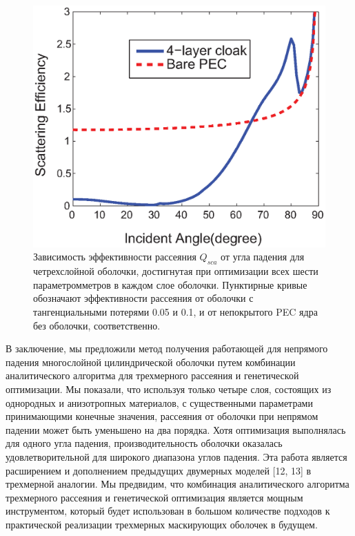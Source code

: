 \documentclass[a4paper, 12pt]{article}
\begin{document}
\begin{figure}
\centering
\includegraphics[width=0.5\columnwidth,draft=false]{Fig_3}
\caption{\label{fig:sca} Зависимость эффективности рассеяния $Q_{sca}$ 
от угла падения для четрехслойной оболочки, достигнутая при оптимизации
всех шести параметромметров в каждом слое оболочки. Пунктирные кривые обозначают
эффективности рассеяния от оболочки с тангенциальными потерями 0.05 и 0.1, и
от непокрытого PEC ядра без оболочки, соответственно.}
\end{figure}

В заключение, мы предложили метод получения работающей для непрямого падения
многослойной цилиндрической оболочки путем комбинации аналитического алгоритма 
для трехмерного рассеяния и генетической оптимизации. Мы показали, что
используя только четыре слоя, состоящих из однородных и анизотропных
материалов, с существенными параметрами принимающими конечные значения,
рассеяния от оболочки при непрямом падении может быть уменьшено на два порядка.
Хотя оптимизация выполнялась для одного угла падения, производительность
оболочки оказалась удовлетворительной для широкого диапазона углов падения.
Эта работа является расширением и дополнением предыдущих двумерных моделей
[12, 13] в трехмерной аналогии. Мы предвидим, что комбинация аналитического 
алгоритма трехмерного рассеяния и генетической оптимизация является мощным
инструментом, который будет использован в большом количестве подходов
к практической реализации трехмерных маскирующих оболочек в будущем.
\end{document}
